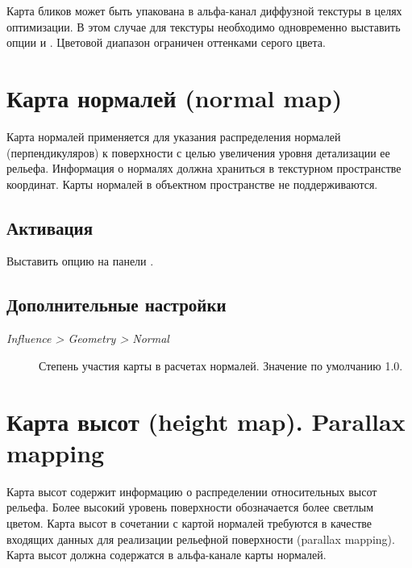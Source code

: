 \documentclass[a4paper,12pt,oneside]{sphinxmanual}
\begin{document}
Карта бликов может быть упакована в альфа-канал диффузной текстуры в целях оптимизации. В этом случае для текстуры необходимо одновременно выставить опции  и . Цветовой диапазон ограничен оттенками серого цвета.


\section{Карта нормалей (normal map)}
\label{textures:index-6}\label{textures:normal-map}
Карта нормалей применяется для указания распределения нормалей (перпендикуляров) к поверхности с целью увеличения уровня детализации ее рельефа. Информация о нормалях должна храниться в текстурном пространстве координат. Карты нормалей в объектном пространстве не поддерживаются.


\subsection{Активация}
\label{textures:id8}
Выставить опцию  на панели .


\subsection{Дополнительные настройки}
\label{textures:id9}\begin{description}
\item[{\emph{Influence \textgreater{} Geometry \textgreater{} Normal}}] \leavevmode
Степень участия карты в расчетах нормалей. Значение по умолчанию 1.0.

\end{description}


\section{Карта высот (height map). Parallax mapping}
\label{textures:index-7}\label{textures:height-map-parallax-mapping}
Карта высот содержит информацию о распределении относительных высот рельефа. Более высокий уровень поверхности обозначается более светлым цветом. Карта высот в сочетании с картой нормалей требуются в качестве входящих данных для реализации рельефной поверхности (parallax mapping). Карта высот должна содержатся в альфа-канале карты нормалей.
\end{document}
